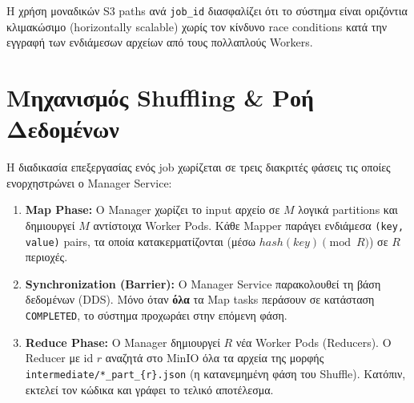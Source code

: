 \documentclass[11pt, a4paper]{article}
\begin{document}
\begin{tcolorbox}[colback=LightBlue, colframe=PrimaryColor, title=\textbf{Σχεδιαστική Απόφαση: Απομόνωση Δεδομένων}, arc=4mm]
Η χρήση μοναδικών S3 paths ανά \texttt{job\_id} διασφαλίζει ότι το σύστημα είναι οριζόντια κλιμακώσιμο (horizontally scalable) χωρίς τον κίνδυνο race conditions κατά την εγγραφή των ενδιάμεσων αρχείων από τους πολλαπλούς Workers.
\end{tcolorbox}

\section{Μηχανισμός Shuffling \& Ροή Δεδομένων}
Η διαδικασία επεξεργασίας ενός job χωρίζεται σε τρεις διακριτές φάσεις τις οποίες ενορχηστρώνει ο Manager Service:

\begin{enumerate}
    \item \textbf{Map Phase:} Ο Manager χωρίζει το input αρχείο σε $M$ λογικά partitions και δημιουργεί $M$ αντίστοιχα Worker Pods. Κάθε Mapper παράγει ενδιάμεσα \texttt{(key, value)} pairs, τα οποία κατακερματίζονται (μέσω $hash(key) \pmod R$) σε $R$ περιοχές.
    
    \item \textbf{Synchronization (Barrier):} Ο Manager Service παρακολουθεί τη βάση δεδομένων (DDS). Μόνο όταν \textbf{όλα} τα Map tasks περάσουν σε κατάσταση \texttt{COMPLETED}, το σύστημα προχωράει στην επόμενη φάση.
    
    \item \textbf{Reduce Phase:} Ο Manager δημιουργεί $R$ νέα Worker Pods (Reducers). Ο Reducer με id $r$ αναζητά στο MinIO όλα τα αρχεία της μορφής \texttt{intermediate/*\_part\_\{r\}.json} (η κατανεμημένη φάση του Shuffle). Κατόπιν, εκτελεί τον κώδικα και γράφει το τελικό αποτέλεσμα.
\end{enumerate}

\newpage %
\end{document}
